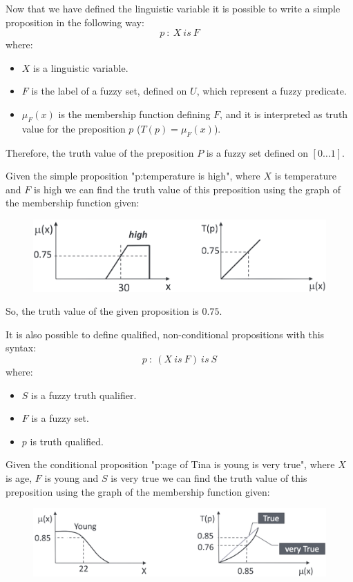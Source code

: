 \documentclass[12pt, a4paper]{report}
\begin{document}
    Now that we have defined the linguistic variable it is possible to write a simple proposition in the following way: 
    \[p\: : \: X \: is \: F\]
    where:
    \begin{itemize}
        \item $X$ is a linguistic variable.
        \item $F$ is the label of a fuzzy set, defined on $U$, which represent a fuzzy predicate.
        \item $\mu_F(x)$ is the membership function defining $F$, and it is interpreted as truth value for the preposition $p$ ($T(p)=\mu_F(x)$).
    \end{itemize}
    Therefore, the truth value of the preposition $P$ is a fuzzy set defined on $[0 \dots 1]$.
    \begin{example}
        Given the simple proposition "p:temperature is high", where $X$ is temperature and $F$ is high we can find the truth value of this 
        preposition using the graph of the membership function given:
        \begin{figure}[H]
            \centering
            \includegraphics[width=0.5\linewidth]{images/temperature.png}
        \end{figure}
        So, the truth value of the given proposition is $0.75$.
    \end{example}

    It is also possible to define qualified, non-conditional propositions with this syntax: 
    \[p \: : \: (X \: is \: F) \: is \: S\]
    where:
    \begin{itemize}
        \item $S$ is a fuzzy truth qualifier.
        \item $F$ is a fuzzy set.
        \item $p$ is truth qualified.
    \end{itemize}
    \begin{example}
        Given the conditional proposition "p:age of Tina is young is very true", where $X$ is age, $F$ is young and $S$ is very true we can 
        find the truth value of this preposition using the graph of the membership function given:
        \begin{figure}[H]
            \centering
            \includegraphics[width=0.75\linewidth]{images/age.png}
        \end{figure}
    \end{example}
\end{document}
